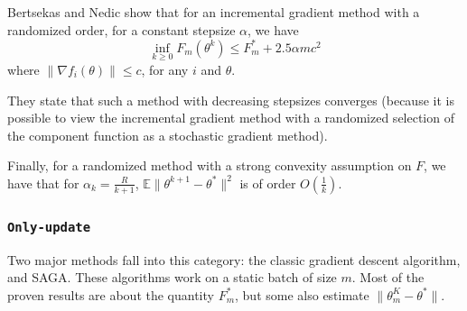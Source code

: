 \documentclass[11pt]{article}
\begin{document}
Bertsekas and Nedic\cite{nedic2001convergence} show that for an incremental gradient method with a randomized order, for a constant stepsize $\alpha$, we have 
\begin{equation}
	\inf_{k \geq 0} F_m(\theta^k) \leq F_m^* + 2.5 \alpha m c^2
\end{equation}
where $\| \nabla f_i(\theta) \| \leq c$, for any $i$ and $\theta$. 

They state that such a method with decreasing stepsizes converges (because it is possible to view the incremental gradient method with a randomized selection of the component function as a stochastic gradient method).

Finally, for a randomized method with a strong convexity assumption on $F$, we have that for $\alpha_k = \frac{R}{k+1}$,  $\mathbb{E} \|\theta^{k+1} - \theta^* \|^2  $ is of order $O(\frac{1}{k})$.


\subsubsection{\texttt{Only-update}}

Two major methods fall into this category: the classic gradient descent algorithm, and SAGA. These algorithms work on a static batch of size $m$. Most of the proven results are about the quantity $F^*_m$, but some also estimate $\|  \theta^K_m - \theta^*\|$.
\end{document}
